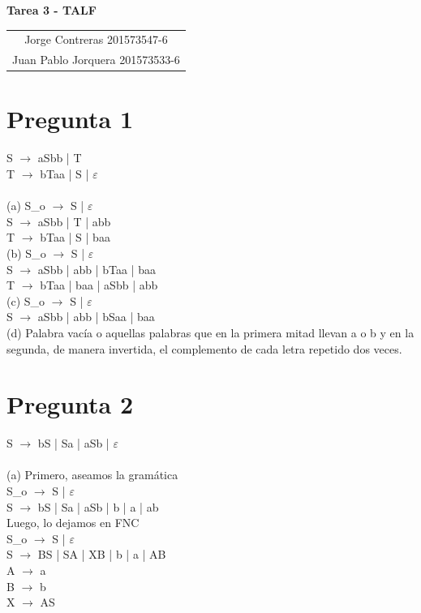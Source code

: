 \documentclass[11pt,letterpaper]{article}
\newcommand{\titulo}{Tarea 3 - TALF}
\newcommand{\integrantes}{\begin{tabular}{c}
Jorge Contreras 201573547-6 \\
Juan Pablo Jorquera  201573533-6 \\
\end{tabular}}
\renewcommand{\maketitle}
{
\thispagestyle{fancy}
\begin{center}
\begin{Large}
\textbf{\titulo}\\
\end{Large}
\vspace{0.5cm}
\integrantes
\end{center}
\vspace{0.3cm}
}
\begin{document}
\maketitle

\section{Pregunta 1}
S $\rightarrow$ aSbb | T \\
\indent T $\rightarrow$ bTaa | S | $\varepsilon$ \\
 \\
 
\noindent (a) S_{o} $\rightarrow$ S | $\varepsilon$ \\
\indent S $\rightarrow$ aSbb | T | abb \\
\indent T $\rightarrow$ bTaa | S | baa \\
 
\noindent (b) S_{o} $\rightarrow$ S | $\varepsilon$ \\
\indent S $\rightarrow$ aSbb | abb | bTaa | baa \\
\indent T $\rightarrow$ bTaa | baa | aSbb | abb \\

\noindent (c) S_{o} $\rightarrow$ S | $\varepsilon$ \\
\indent S $\rightarrow$ aSbb | abb | bSaa | baa \\

\noindent (d) Palabra vacía o aquellas palabras que en la primera mitad llevan a o b y en la segunda, de manera invertida, el complemento de cada letra repetido dos veces.

\section{Pregunta 2}
S $\rightarrow$ bS | Sa | aSb | $\varepsilon$ \\
 \\
 
\noindent (a) Primero, aseamos la gramática \\
\indent S_{o} $\rightarrow$ S | $\varepsilon$ \\
\indent S $\rightarrow$ bS | Sa | aSb | b | a | ab \\

Luego, lo dejamos en FNC \\
\indent S_{o} $\rightarrow$ S | $\varepsilon$ \\
\indent S $\rightarrow$ BS | SA | XB | b | a | AB \\
\indent A $\rightarrow$ a \\
\indent B $\rightarrow$ b \\
\indent X $\rightarrow$ AS \\
 \\
\end{document}
